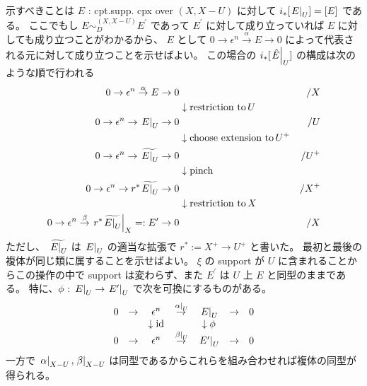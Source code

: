 \documentclass[dvipdfmx]{jsarticle}
\begin{document}
\begin{Proof}
\itemprof
  示すべきことは \(E\) : cpt.supp. cpx over \((X,X-U)\) に対して \(i_*[\left. {E} \right| _{U}] = [E]\) である。
  ここでもし \(E \sim_{D}^{(X,X-U)} E^\prime\) であって \(E^\prime\) に対して成り立っていれば \(E\) に対しても成り立つことがわかるから、 \(E\) として \(0 \to \epsilon^n \overset{\alpha}{\to} E \to 0\) によって代表される元に対して成り立つことを示せばよい。
  この場合の \(i_* [\left. {\hat{E}} \right| _{U}]\) の構成は次のような順で行われる
  \begin{align*}
    0 \to \epsilon^n \overset{\alpha}{\to} E \to 0 & &/ X \\
    & \downarrow \text{restriction to} \, U \\
    0 \to \epsilon^n \to \left. {E} \right| _{U} \to 0 & &/ U \\
    & \downarrow \text{choose extension to} \, U^+ \\
    0 \to \epsilon^n \to \widetilde{\left. {E} \right| _{U}} \to 0 & &/ U^+ \\
    & \downarrow \text{pinch} \\
    0 \to \epsilon^n \to r^* \widetilde{\left. {E} \right| _{U}} \to 0 & &/ X^+ \\
    & \downarrow \text{restriction to} \, X \\
    0 \to \epsilon^n \overset{\beta}{\to} \left. {r^* \widetilde{\left. {E} \right| _{U}}} \right| _{X} =: E^\prime \to 0 & &/ X
  \end{align*}
  ただし、 \(\widetilde{\left. {E} \right| _{U}}\) は \(\left. {E} \right| _{U}\) の適当な拡張で \(r^* := X^+ \to U^+\) と書いた。
  最初と最後の複体が同じ類に属することを示せばよい。
  \(\xi\) の support が \(U\) に含まれることからこの操作の中で support は変わらず、また \(E^\prime\) は \(U\) 上 \(E\) と同型のままである。
  特に、\(\phi\) : \(\left. {E} \right| _{U} \to \left. {E^\prime} \right| _{U}\) で次を可換にするものがある。
  \[
  \begin{matrix}
    0 & \to & \epsilon^n & \overset{\left. {\alpha} \right| _{U}}{\to} & \left. {E} \right| _{U} & \to & 0 \\
     & & \downarrow \text{id} & & \downarrow \phi & & \\
     0 & \to & \epsilon^n & \overset{\left. {\beta} \right| _{U}}{\to} & \left. {E^\prime} \right| _{U} & \to & 0 \\
  \end{matrix}
  \]
  一方で \(\left. {\alpha} \right| _{X-U} , \left. {\beta} \right| _{X-U}\) は同型であるからこれらを組み合わせれば複体の同型が得られる。
\end{Proof}
\end{document}
